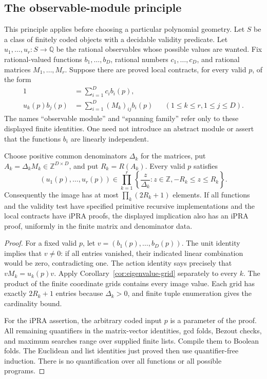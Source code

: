 \subsection{The observable-module principle}

This principle applies before choosing a particular polynomial geometry.
Let $S$ be a class of finitely coded objects with a decidable validity
predicate.  Let $u_1,\ldots,u_r:S\to\mathbb Q$ be the rational
observables whose possible values are wanted.  Fix rational-valued
functions $b_1,\ldots,b_D$, rational numbers $c_1,\ldots,c_D$,
and rational matrices $M_1,\ldots,M_r$.  Suppose there are proved
local contracts, for every valid $p$, of the form
\begin{align}
  1&=\sum_{i=1}^D c_i b_i(p),
      \label{eq:observable-unit}\\
  u_k(p)b_j(p)&=\sum_{i=1}^D (M_k)_{ij}b_i(p)
      &&(1\le k\le r, 1\le j\le D).
      \label{eq:observable-action}
\end{align}
The names ``observable module'' and ``spanning family'' refer only to
these displayed finite identities.  One need not introduce an abstract
module or assert that the functions $b_i$ are linearly independent.

\begin{theorem}
\label{thm:finite-observable-image}
Choose positive common denominators $\Delta_k$ for the matrices,
put $A_k=\Delta_kM_k\in\mathbb Z^{D\times D}$, and put
$R_k=R(A_k)$.  Every valid $p$ satisfies
\[
 (u_1(p),\ldots,u_r(p))\in
 \prod_{k=1}^r\left\{\frac z{\Delta_k}:z\in\mathbb Z,
                                      -R_k\le z\le R_k\right\}.
 \label{eq:observable-grid}
\]
Consequently the image has at most $\prod_k(2R_k+1)$ elements.
If all functions and the validity test have specified primitive
recursive implementations and the local contracts have iPRA proofs,
the displayed implication also has an iPRA proof, uniformly in the
finite matrix and denominator data.
\end{theorem}

\begin{proof}
For a fixed valid $p$, let $v=(b_1(p),\ldots,b_D(p))$.
The unit identity implies that $v\ne0$: if all entries vanished,
their indicated linear combination would be zero, contradicting one.
The action identity says precisely that $vM_k=u_k(p)v$.
Apply Corollary~\ref{cor:eigenvalue-grid} separately to every $k$.
The product of the finite coordinate grids contains every image value.
Each grid has exactly $2R_k+1$ entries because $\Delta_k>0$,
and finite tuple enumeration gives the cardinality bound.

For the iPRA assertion, the arbitrary coded input $p$ is a parameter
of the proof.  All remaining quantifiers in the matrix-vector
identities, gcd folds, Bezout checks, and maximum searches range over
supplied finite lists.  Compile them to Boolean folds.  The Euclidean
and list identities just proved then use quantifier-free induction.
There is no quantification over all functions or all possible programs.
\end{proof}

